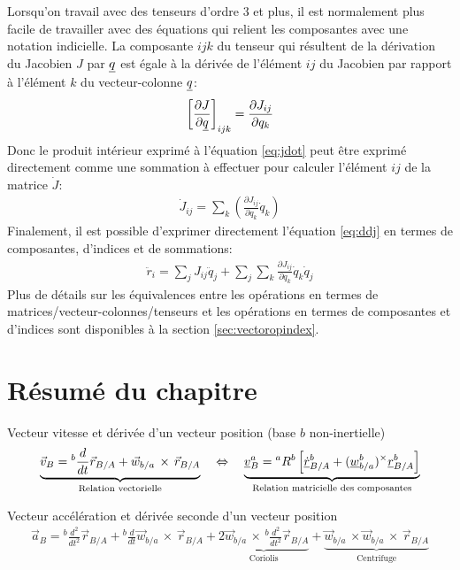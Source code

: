 Lorsqu'on travail avec des tenseurs d'ordre 3 et plus, il est normalement plus facile de travailler avec des équations qui relient les composantes avec une notation indicielle. La composante $ijk$ du tenseur qui résultent de la dérivation du Jacobien $J$ par $\underline{q}$ est égale à la dérivée de l'élément $ij$ du Jacobien par rapport à l'élément $k$ du vecteur-colonne $\underline{q}$:
\begin{align}
\left[\frac{ \partial J}{\partial \underline{q}} \right]_{ijk} = \frac{ \partial J_{ij} }{\partial q_k } 
\end{align}
 Donc le produit intérieur exprimé à l'équation \eqref{eq:jdot} peut être exprimé directement comme une sommation à effectuer pour calculer l'élément $ij$ de la matrice $\dot{J}$:
\begin{align}
\dot{J}_{ij} = \sum_k \left( \frac{ \partial J_{ij} }{\partial q_k } \dot{q}_k \right)
\end{align}
Finalement, il est possible d'exprimer directement l'équation \eqref{eq:ddj} en termes de composantes, d'indices et de sommations:
\begin{align}
\ddot{r}_{i} =  
\sum_j J_{ij} \ddot{q}_j
+
\sum_j 
\sum_k  \frac{ \partial J_{ij} }{\partial q_k } \dot{q}_k 
\dot{q}_j
\end{align}
Plus de détails sur les équivalences entre les opérations en termes de matrices/vecteur-colonnes/tenseurs et les opérations en termes de composantes et d'indices sont disponibles à la section \ref{sec:vectoropindex}.




\newpage
\section{Résumé du chapitre}


Vecteur vitesse et dérivée d'un vecteur position (base $b$ non-inertielle)
\begin{align}
\underbrace{
\vec{v}_{B} = {}^{b}\frac{d}{dt} \vec{r}_{B/A} +  \vec{w}_{b/a} \, \times \, \vec{r}_{B/A}
}_{\text{Relation vectorielle}}
\quad \Leftrightarrow \quad 
\underbrace{
\underline{v}_{B}^{a} = {}^{a}R^b \left[ \underline{\dot{r}}^b_{B/A} +  (\underline{w}_{b/a}^b)^{\times} \underline{r}^b_{B/A}  \right] 
}_{\text{Relation matricielle des composantes}}
\end{align}

Vecteur accélération et dérivée seconde d'un vecteur position
\begin{align}
\vec{a}_{B} = 
{}^{b}\frac{d^2}{dt^2} \vec{r}_{B/A} 
+  
{}^{b}\frac{d}{dt} \vec{w}_{b/a} \, \times \, \vec{r}_{B/A}
+
\underbrace{
2 \vec{w}_{b/a} \, \times \, {}^{b}\frac{d^2}{dt^2} \vec{r}_{B/A}
}_{\text{Coriolis}}
+
\underbrace{
\vec{w}_{b/a} \, \times \vec{w}_{b/a} \, \times \,
\vec{r}_{B/A}
}_{\text{Centrifuge}}
\end{align}

